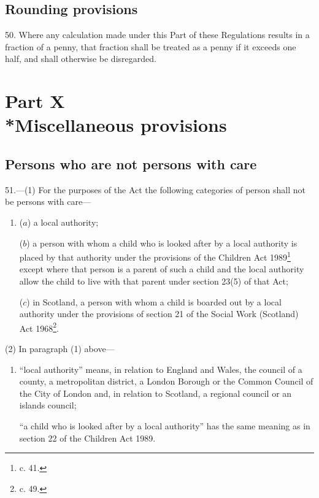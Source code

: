 \documentclass[a4paper,12pt]{article}
\begin{document}
\subsection[50. Rounding provisions]{Rounding provisions}

50.  Where any calculation made under this Part of these Regulations results in a fraction of a penny, that fraction shall be treated as a penny if it exceeds one half, and shall otherwise be disregarded.

\section[Part X --- Miscellaneous provisions]{Part X\\*Miscellaneous provisions}

\renewcommand\parthead{--- Part X}

\subsection[51. Persons who are not persons with care]{Persons who are not persons with care}

51.—(1) For the purposes of the Act the following categories of person shall not be persons with care—
\begin{enumerate}\item[]
($a$) a local authority;

($b$) a person with whom a child who is looked after by a local authority is placed by that authority under the provisions of the Children Act 1989\footnote{ c. 41.}
except where that person is a parent of such a child and the local authority allow the child to live with that parent under section 23(5) of that Act; %

($c$) in Scotland, a person with whom a child is boarded out by a local authority under the provisions of section 21 of the Social Work (Scotland) Act 1968\footnote{ c. 49.}.
\end{enumerate}

(2) In paragraph (1) above—
\begin{enumerate}\item[]
“local authority” means, in relation to England and Wales, the council of a county, a metropolitan district, a London Borough or the Common Council of the City of London and, in relation to Scotland, a regional council or an islands council;

“a child who is looked after by a local authority” has the same meaning as in section 22 of the Children Act 1989.
\end{enumerate}
\end{document}
